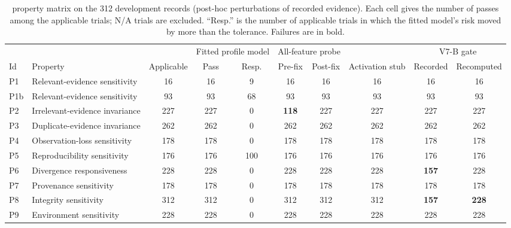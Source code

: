 \begin{table}[!t]
\caption{\ers{} property matrix on the 312 development records (post-hoc perturbations of recorded evidence). Each cell gives the number of passes among the applicable trials; N/A trials are excluded. ``Resp.'' is the number of applicable trials in which the fitted model's risk moved by more than the tolerance. Failures are in bold.}
\label{tab:ers}
\centering
\footnotesize
\setlength{\tabcolsep}{4pt}
\begin{tabular}{|l|l|c|c|c|c|c|c|c|c|}
\hline
 & & & \multicolumn{2}{c|}{Fitted profile model} & \multicolumn{2}{c|}{All-feature probe} & & \multicolumn{2}{c|}{V7-B gate} \\
Id & Property & Applicable & Pass & Resp. & Pre-fix & Post-fix & Activation stub & Recorded & Recomputed \\
\hline
P1 & Relevant-evidence sensitivity & 16 & 16 & 9 & 16 & 16 & 16 & 16 & 16 \\
P1b & Relevant-evidence sensitivity & 93 & 93 & 68 & 93 & 93 & 93 & 93 & 93 \\
P2 & Irrelevant-evidence invariance & 227 & 227 & 0 & \textbf{118} & 227 & 227 & 227 & 227 \\
P3 & Duplicate-evidence invariance & 262 & 262 & 0 & 262 & 262 & 262 & 262 & 262 \\
P4 & Observation-loss sensitivity & 178 & 178 & 0 & 178 & 178 & 178 & 178 & 178 \\
P5 & Reproducibility sensitivity & 176 & 176 & 100 & 176 & 176 & 176 & 176 & 176 \\
P6 & Divergence responsiveness & 228 & 228 & 0 & 228 & 228 & 228 & \textbf{157} & 228 \\
P7 & Provenance sensitivity & 178 & 178 & 0 & 178 & 178 & 178 & 178 & 178 \\
P8 & Integrity sensitivity & 312 & 312 & 0 & 312 & 312 & 312 & \textbf{157} & \textbf{228} \\
P9 & Environment sensitivity & 228 & 228 & 0 & 228 & 228 & 228 & 228 & 228 \\
\hline
\end{tabular}
\\[3pt]

\end{table}

